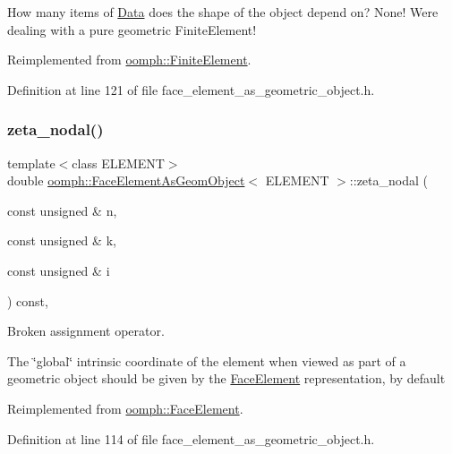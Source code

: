 How many items of \hyperlink{classoomph_1_1Data}{Data} does the shape of the object depend on? None! We\textquotesingle{}re dealing with a pure geometric Finite\+Element! 



Reimplemented from \hyperlink{classoomph_1_1FiniteElement_ae09e3e0c01b6143d511f2626d2ee535c}{oomph\+::\+Finite\+Element}.



Definition at line 121 of file face\+\_\+element\+\_\+as\+\_\+geometric\+\_\+object.\+h.

\mbox{\label{classoomph_1_1FaceElementAsGeomObject_aa5971a8b6d24780bfc3c05be7a88852d}} 
\subsubsection{\texorpdfstring{zeta\+\_\+nodal()}{zeta\_nodal()}}
{\footnotesize\ttfamily template$<$class E\+L\+E\+M\+E\+NT$>$ \\
double \hyperlink{classoomph_1_1FaceElementAsGeomObject}{oomph\+::\+Face\+Element\+As\+Geom\+Object}$<$ E\+L\+E\+M\+E\+NT $>$\+::zeta\+\_\+nodal (\begin{DoxyParamCaption}\item[{const unsigned \&}]{n,  }\item[{const unsigned \&}]{k,  }\item[{const unsigned \&}]{i }\end{DoxyParamCaption}) const\hspace{0.3cm}{\ttfamily [inline]}, {\ttfamily [virtual]}}



Broken assignment operator. 

The \char`\"{}global\char`\"{} intrinsic coordinate of the element when viewed as part of a geometric object should be given by the \hyperlink{classoomph_1_1FaceElement}{Face\+Element} representation, by default 

Reimplemented from \hyperlink{classoomph_1_1FaceElement_a58c9f93705c7741f76c8487d152e68a6}{oomph\+::\+Face\+Element}.



Definition at line 114 of file face\+\_\+element\+\_\+as\+\_\+geometric\+\_\+object.\+h.



